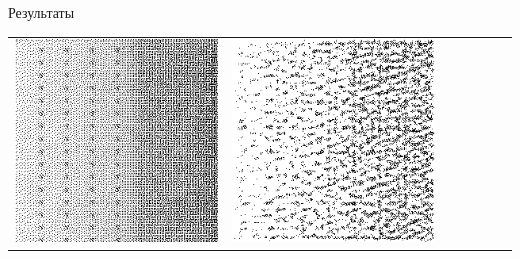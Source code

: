 \documentclass[12pt]{beamer}
\begin{document}
\begin{frame}{Результаты}
\begin{table}
\begin{center}
\begin{tabular}{p{1.2cm} p{1.2cm} p{1.2cm} p{1.2cm} p{1.2cm} p{1.2cm} p{1.2cm}}
					\includegraphics[width=1\linewidth]{8-results/sand-trend8/nf64e1/gen3}
					&
					\includegraphics[width=1\linewidth]{8-results/sand-trend8/nf64e5/gen3}
					&

\end{tabular}
\end{center}
\end{table}
\end{frame}
\end{document}
